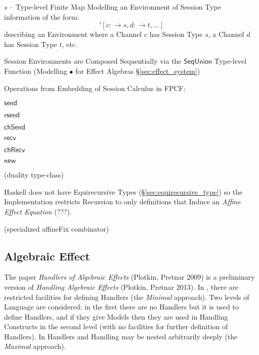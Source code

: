 $s$ -- Type-level Finite Map Modelling an Environment of Session Type
information of the form:
\[
  '[c :\rightarrow s, d :\rightarrow t, \ldots]
\]
describing an Environment where a Channel $c$ has Session Type $s$, a
Channel $d$ has Session Type $t$, etc.

Session Environments are Composed Sequentially via the
$\mathsf{SeqUnion}$ Type-level Function (Modelling $\bullet$ for
Effect Algebras \S\ref{sec:effect_system})

Operations from Embedding of Session Calculus in FPCF: %

$\mathsf{send}$

$\mathsf{rsend}$

$\mathsf{chSend}$

$\mathsf{recv}$

$\mathsf{chRecv}$

$\mathsf{new}$

(duality type-class)

\fist Haskell does not have Equirecursive Types
(\S\ref{sec:equirecursive_type}) so the Implementation restricts
Recursion to only definitions that Induce an \emph{Affine Effect
  Equation} (???). %

(specialized affineFix combinator) %



\subsection{Algebraic Effect}\label{sec:algebraic_effect}

\cite{nielson-nielson99}
\cite{plotkin-pretnar09}
\cite{plotkin-pretnar13}
\cite{pretnar15}

\fist The paper \emph{Handlers of Algebraic Effects}
\cite{plotkin-pretnar09} (Plotkin, Pretnar 2009) is a preliminary
version of \emph{Handling Algebraic Effects} \cite{plotkin-pretnar13}
(Plotkin, Pretnar 2013). In \cite{plotkin-pretnar09}, there are
restricted facilities for defining Handlers (the \emph{Minimal}
approach). Two levels of Language are considered: in the first there
are no Handlers but it is used to define Handlers, and if they give
Models then they are used in Handling Constructs in the second level
(with no facilities for further definition of Handlers). In
\cite{plotkin-pretnar13} Handlers and Handling may be nested
arbitrarily deeply (the \emph{Maximal} approach).


